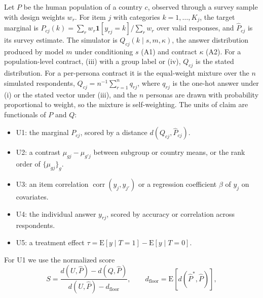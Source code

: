 \documentclass[11pt]{article}
\begin{document}
Let $P$ be the human population of a country $c$, observed through a survey sample with design weights $w_r$. For item $j$ with categories $k = 1,\dots,K_j$, the target marginal is $P_{cj}(k) = \sum_r w_r \mathbf{1}[y_{rj}=k] / \sum_r w_r$ over valid responses, and $\hat P_{cj}$ is its survey estimate. The simulator is $Q_{cj}(k \mid s, m, \kappa)$, the answer distribution produced by model $m$ under conditioning $s$ (A1) and contract $\kappa$ (A2). For a population-level contract, (iii) with a group label or (iv), $Q_{cj}$ is the stated distribution. For a per-persona contract it is the equal-weight mixture over the $n$ simulated respondents, $Q_{cj} = n^{-1}\sum_{r=1}^{n} q_{rj}$, where $q_{rj}$ is the one-hot answer under (i) or the stated vector under (iii), and the $n$ personas are drawn with probability proportional to weight, so the mixture is self-weighting. The units of claim are functionals of $P$ and $Q$:
\begin{itemize}
  \item U1: the marginal $P_{cj}$, scored by a distance $d(Q_{cj}, \hat P_{cj})$.
  \item U2: a contrast $\mu_{gj} - \mu_{g'j}$ between subgroup or country means, or the rank order of $\{\mu_{gj}\}_g$.
  \item U3: an item correlation $\operatorname{corr}(y_j, y_{j'})$ or a regression coefficient $\beta$ of $y_j$ on covariates.
  \item U4: the individual answer $y_{rj}$, scored by accuracy or correlation across respondents.
  \item U5: a treatment effect $\tau = \mathrm{E}[y \mid T=1] - \mathrm{E}[y \mid T=0]$.
\end{itemize}
For U1 we use the normalized score
\begin{equation}
S = \frac{d(U, \hat P) - d(Q, \hat P)}{d(U, \hat P) - d_{\text{floor}}}, \qquad d_{\text{floor}} = \mathrm{E}\left[d(\hat P^{*}, \hat P)\right],
\end{equation}
\end{document}
